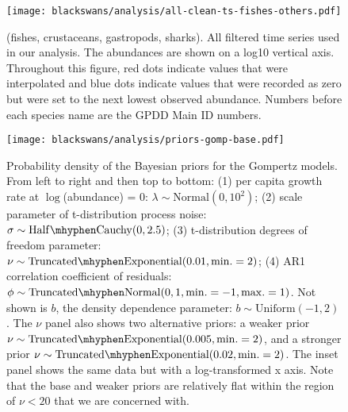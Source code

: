 \begin{figure}[htbp]
\begin{center}
\texttt{[image: blackswans/analysis/all-clean-ts-fishes-others.pdf]}

\caption[All filtered time series used in our analysis.]{(fishes, crustaceans,
  gastropods, sharks). All filtered time series used in our analysis. The
  abundances are shown on a log10 vertical axis. Throughout this figure, red
  dots indicate values that were interpolated and blue dots indicate values
  that were recorded as zero but were set to the next lowest observed
  abundance. Numbers before each species name are the GPDD Main ID numbers.}

\label{fig:all-ts}
\end{center}
\end{figure}

\clearpage

\begin{figure}[htbp]
\begin{center}
\texttt{[image: blackswans/analysis/priors-gomp-base.pdf]}

\caption[Probability density of the Bayesian priors for the Gompertz models.]{
  Probability density of the Bayesian priors for the Gompertz models. From
  left to right and then top to bottom: (1) per capita growth rate at
  $\log$(abundance) = $0$: $\lambda \sim \mathrm{Normal}(0, 10^2)$; (2) scale
  parameter of t-distribution process noise: $\sigma \sim \mathrm{Half\mhyphen
    Cauchy} (0, 2.5)$; (3) t-distribution degrees of freedom parameter: $\nu
  \sim \mathrm{Truncated\mhyphen Exponential}(0.01, \mathrm{min.} = 2)$; (4)
  AR1 correlation coefficient of residuals: $\phi \sim \mathrm{Truncated
    \mhyphen Normal}(0, 1, \mathrm{min.} = -1, \mathrm{max.} = 1)$. Not shown
  is $b$, the density dependence parameter: $b \sim \mathrm{Uniform}(-1, 2)$.
  The $\nu$ panel also shows two alternative priors: a weaker prior $\nu \sim
  \mathrm{Truncated\mhyphen Exponential}(0.005, \mathrm{min.} = 2)$, and a
  stronger prior $\nu \sim \mathrm{Truncated\mhyphen Exponential}(0.02,
  \mathrm{min.} = 2)$. The inset panel shows the same data but with a
  log-transformed x axis. Note that the base and weaker priors are relatively
  flat within the region of $\nu < 20$ that we are concerned with. }

\label{fig:priors}
\end{center}
\end{figure}

